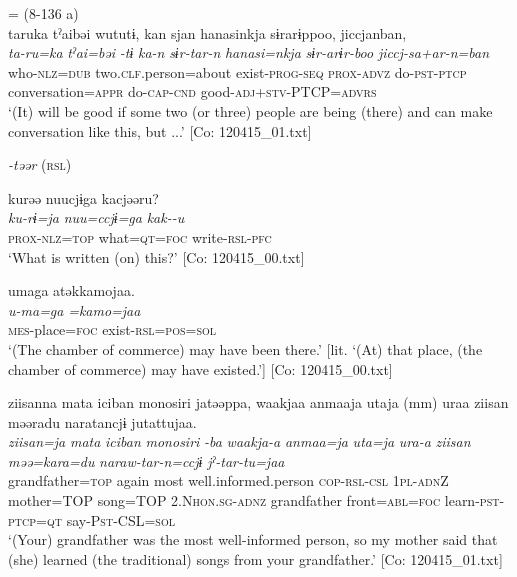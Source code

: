   \ex{} = (8-136 a)\\
     \glll      taruka  tˀaibəi  wututɨ,  kan   sjan  hanasinkja  sɨrarɨppoo,  jiccjanban,\\
      \textit{ta-ru=ka}  \textit{tˀai=bəi}  \textit{-tɨ}  \textit{ka-n} \textit{sɨr-tar-n}  \textit{hanasi=nkja}  \textit{sɨr-arɨr-boo}  \textit{jiccj-sa+ar-n=ban}\\
      who-\textsc{nlz}=\textsc{dub}  two.\textsc{clf}.person=about  exist-\textsc{prog}-\textsc{seq}  \textsc{prox}-\textsc{advz}   do-\textsc{pst}-\textsc{ptcp}  conversation=\textsc{appr}  do-\textsc{cap}-\textsc{cnd}  good-\textsc{adj}+\textsc{stv}-PTCP=\textsc{advrs}   \\
      \glt       ‘(It) will be good if some two (or three) people are being (there) and can make conversation like this, but ...’ [Co: 120415\_01.txt]

\exi{} \textit{{}-təər} (\textsc{rsl})

\ex \label{ex:9.9c} %
     \glll     kurəə  nuucjɨga  kacjəəru?\\
      \textit{ku-rɨ=ja}  \textit{nuu=ccjɨ=ga}  \textit{kak--u}\\
      \textsc{prox}-\textsc{nlz}=\textsc{top}  what=\textsc{qt}=\textsc{foc}  write-\textsc{rsl}-\textsc{pfc}\\
      \glt       ‘What is written (on) this?’ [Co: 120415\_00.txt]

\ex \label{ex:9.9d} %
      \glll  umaga  atəkkamojaa.\\
      \textit{u-ma=ga}  \textit{=kamo=jaa}\\
      \textsc{mes}-place=\textsc{foc}  exist-\textsc{rsl}=\textsc{pos}=\textsc{sol}\\
      \glt       ‘(The chamber of commerce) may have been there.’ [lit. ‘(At) that place, (the chamber of commerce) may have existed.’] [Co: 120415\_00.txt]

\ex \label{9.9e} %
      \glll ziisanna  mata  {\textbar}iciban  monosiri{\textbar}  jatəəppa,  waakjaa  anmaaja  utaja  (mm)  uraa  ziisan  məəradu  naratancjɨ  jutattujaa.\\
      \textit{ziisan=ja}  \textit{mata}  \textit{iciban}  \textit{monosiri}  \textit{-ba}  \textit{waakja-a}  \textit{anmaa=ja}  \textit{uta=ja}    \textit{ura-a}   \textit{ziisan} \textit{məə=kara=du}  \textit{naraw-tar-n=ccjɨ}  \textit{jˀ-tar-tu=jaa}\\
      grandfather=\textsc{top}  again  most  well.informed.person  \textsc{cop}-\textsc{rsl}-\textsc{csl}  1\textsc{pl}-\textsc{adn}Z  mother=TOP  song=TOP    2.N\textsc{hon}.\textsc{sg}-\textsc{adnz}   grandfather  front=\textsc{abl}=\textsc{foc}  learn-\textsc{pst}-\textsc{ptcp}=\textsc{qt}  say-P\textsc{st}-CSL=\textsc{sol}\\
      \glt  ‘(Your) grandfather was the most well-informed person, so my mother said that (she) learned (the traditional) songs from your grandfather.’ [Co: 120415\_01.txt]
    \z
\z

